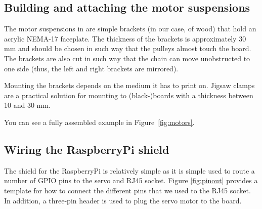 \documentclass[a4paper,10pt]{article}
\begin{document}
\subsection{Building and attaching the motor suspensions}

The motor suspensions in are simple brackets (in our case, of wood) that hold an acrylic NEMA-17 faceplate. The thickness of the brackets is approximately 30 mm and should be chosen in such way that the pulleys almost touch the board. The brackets are also cut in such way that the chain can move unobstructed to one side (thus, the left and right brackets are mirrored).

Mounting the brackets depends on the medium it has to print on. Jigsaw clamps are a practical solution for mounting to (black-)boards with a thickness between 10 and 30 mm.

You can see a fully assembled example in Figure~\ref{fig:motors}.

\subsection{Wiring the RaspberryPi shield}

The shield for the RaspberryPi is relatively simple as it is simple used to route a number of GPIO pins to the servo and RJ45 socket. Figure \ref{fig:pinout} provides a template for how to connect the different pins that we used to the RJ45 socket. In addition, a three-pin header is used to plug the servo motor to the board.
\end{document}

